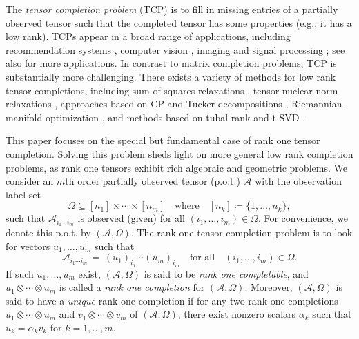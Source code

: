 \documentclass{amsart}
\def\af{\alpha}
\newcommand{\mc}[1]{\mathcal{#1}}
\newcommand{\ddd}{,\ldots,}
\newcommand{\be}{\begin{equation}}
\newcommand{\ee}{\end{equation}}
\theoremstyle{definition}
\numberwithin{equation}{section}
\begin{document}
The {\it tensor completion problem} (TCP) 
is to fill in missing entries of a partially observed tensor
such that the completed tensor has some properties (e.g., it has a low rank).
TCPs appear in a broad range of applications, 
including recommendation systems \cite{Frolov2015,Karatzoglou2010}, 
computer vision \cite{qin2022,qiu2021}, 
imaging and signal processing \cite{Lim2010,Lim2013,zhao2020};
see also \cite{KolBad09} for more applications.
In contrast to matrix completion problems, TCP is substantially more challenging.
There exists a variety of methods for low rank tensor completions,
including sum-of-squares relaxations \cite{barak2022},
tensor nuclear norm relaxations
\cite{mu2014,nieNuclear,tang2015,tian2024,yuan2016},
approaches based on CP and Tucker decompositions
\cite{ashraphijuo2017,bai2016,qiu2021,zhao2020},
Riemannian-manifold optimization
\cite{dong2022,kressner2014,steinlechner2016,swijsen2022},
and methods based on tubal rank and t-SVD
\cite{jiang2019,kilmer2011,wang19,zhang2017}.



This paper focuses on the special but fundamental case of rank one tensor completion.
Solving this problem sheds light on more general low rank completion problems,
as rank one tensors exhibit rich algebraic and geometric problems.
We consider an $m$th order partially observed tensor (p.o.t.)
$\mc{A}$ with the observation label set
\[
\Omega \subseteq [n_1] \times \cdots \times [n_m]
\quad \text{where} \quad [n_k] \coloneqq \{ 1\ddd n_k \},
\]
such that $\mc{A}_{i_1 \cdots i_m}$ is observed (given) for all $(i_1 \ddd i_m) \in \Omega$.
For convenience, we denote this p.o.t. by $(\mc{A}, \Omega)$.
The rank one tensor completion problem is to look for vectors
$u_1 \ddd u_m$ such that 
\be\label{tc_comp}
\mc{A}_{i_1 \cdots i_m} \,=\, (u_1)_{i_1} \cdots (u_m)_{i_m}
\quad \text{for all} \quad (i_1\ddd i_m) \in \Omega.
\ee
If such $u_1 \ddd u_m$ exist, $(\mc{A}, \Omega)$ is said to be {\it rank one completable},
and $u_1 \otimes \cdots \otimes u_m$ is called a {\it rank one completion} for $(\mc{A}, \Omega)$.
Moreover, $(\mc{A}, \Omega)$ is said to have a {\it unique} rank one completion if
for any two rank one completions 
$u_1 \otimes \cdots \otimes u_m$ and $v_1 \otimes \cdots \otimes v_m$
of $(\mc{A}, \Omega)$,
there exist nonzero scalars $\af_k$ such that 
$u_k = \af_k v_k$ for $k=1 \ddd m$.
\end{document}
